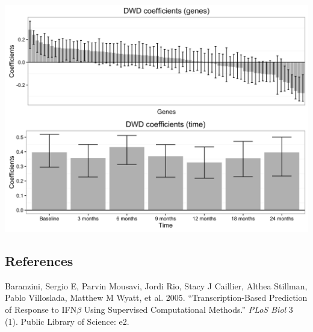 \documentclass[]{article}
\begin{document}
\includegraphics{TimeCourseCoefficients_INFB.png}

\subsection*{References}\label{references}

Baranzini, Sergio E, Parvin Mousavi, Jordi Rio, Stacy J Caillier, Althea
Stillman, Pablo Villoslada, Matthew M Wyatt, et al. 2005.
``Transcription-Based Prediction of Response to IFN$\beta$ Using
Supervised Computational Methods.'' \emph{PLoS Biol} 3 (1). Public
Library of Science: e2.
\end{document}
